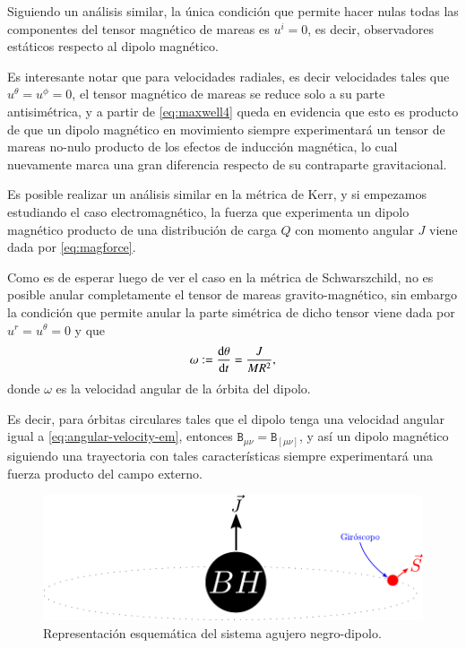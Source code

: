 Siguiendo un análisis similar, la única condición que permite hacer nulas todas las componentes del tensor magnético de mareas es $u^i=0$, es decir, observadores estáticos respecto al dipolo magnético. 

Es interesante notar que para velocidades radiales, es decir velocidades tales que $u^{\theta} = u^{\phi} = 0$, el tensor magnético de mareas se reduce solo a su parte antisimétrica, y a partir de \eqref{eq:maxwell4} queda en evidencia que esto es producto de que un dipolo magnético en movimiento siempre experimentará un tensor de mareas no-nulo producto de los efectos de inducción magnética, lo cual nuevamente marca una gran diferencia respecto de su contraparte gravitacional.

Es posible realizar un análisis similar en la métrica de Kerr, y si empezamos estudiando el caso electromagnético, la fuerza que experimenta un dipolo magnético producto de una distribución de carga $Q$ con momento angular $J$ viene dada por \eqref{eq:magforce}. 

Como es de esperar luego de ver el caso en la métrica de Schwarszchild, no es posible anular completamente el tensor de mareas gravito-magnético, sin embargo la condición que permite anular la parte simétrica de dicho tensor viene dada por $u^r=u^{\theta}=0$ y que
\begin{equation}
\label{eq:angular-velocity-em}
\omega := \dv{\theta}{t} = \frac{J}{MR^2},
\end{equation}
donde $\omega$ es la velocidad angular de la órbita del dipolo.

Es decir, para órbitas circulares tales que el dipolo tenga una velocidad angular igual a \eqref{eq:angular-velocity-em}, entonces $\mathtt{B}_{\mu \nu} = \mathtt{B}_{[\mu \nu]}$, y así un dipolo magnético siguiendo una trayectoria con tales características siempre experimentará una fuerza producto del campo externo.

\begin{figure}[!h]
\centering
\includegraphics[scale=0.9]{images/solucion-en-kerr.pdf}
\caption[Solución helicoidal en Kerr]{Representación esquemática del sistema agujero negro-dipolo.}
\label{fig:7}
\end{figure}

